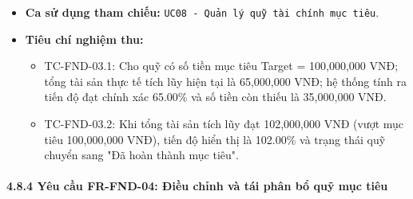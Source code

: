 \documentclass[11pt,a4paper]{article}
\providecommand{\tightlist}{
  \setlength{\itemsep}{0pt}\setlength{\parskip}{0pt}}
\begin{document}
\begin{itemize}
  \begin{itemize}
  \tightlist
  \item
    Báo cáo chi tiết tiến độ quỹ gồm: Tổng tài sản thực tế, Phân rã 3
    cấu phần (Tiền mặt, Tiết kiệm, Đầu tư), Số tiền mục tiêu, Tỷ lệ tiến
    độ (\%), Số tiền còn thiếu, Trạng thái hoàn thành.
  \end{itemize}
\item
  \textbf{Ca sử dụng tham chiếu:}
  \texttt{UC08\ -\ Quản\ lý\ quỹ\ tài\ chính\ mục\ tiêu}.
\item
  \textbf{Tiêu chí nghiệm thu:}

  \begin{itemize}
  \tightlist
  \item
    TC-FND-03.1: Cho quỹ có số tiền mục tiêu Target = 100,000,000 VNĐ;
    tổng tài sản thực tế tích lũy hiện tại là 65,000,000 VNĐ; hệ thống
    tính ra tiến độ đạt chính xác 65.00\% và số tiền còn thiếu là
    35,000,000 VNĐ.
  \item
    TC-FND-03.2: Khi tổng tài sản tích lũy đạt 102,000,000 VNĐ (vượt mục
    tiêu 100,000,000 VNĐ), tiến độ hiển thị là 102.00\% và trạng thái
    quỹ chuyển sang "Đã hoàn thành mục tiêu".
  \end{itemize}
\end{itemize}

\paragraph{4.8.4 Yêu cầu FR-FND-04: Điều chỉnh và tái phân bổ quỹ mục
tiêu}\label{484-yuxeau-cux1ea7u-fr-fnd-04-ux111iux1ec1u-chux1ec9nh-vuxe0-tuxe1i-phuxe2n-bux1ed5-quux1ef9-mux1ee5c-tiuxeau}
\end{document}
